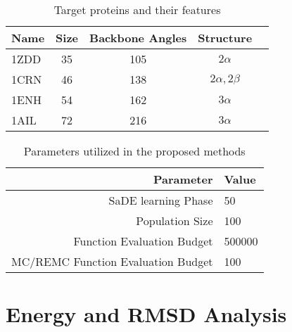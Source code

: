 \begin{table}[bh]
  \centering
  \begin{tabular}{ l | c | c | c | c }
    \hline \hline
    Name & Size & Backbone Angles & Structure         \\ \hline \hline
    1ZDD & 35   & 105             & $2\alpha$         \\ \hline
    1CRN & 46   & 138             & $2\alpha, 2\beta$ \\ \hline
    1ENH & 54   & 162             & $3\alpha$         \\ \hline
    1AIL & 72   & 216             & $3\alpha$         \\ \hline
    \hline
  \end{tabular}
  \caption{Target proteins and their features}
  \label{tab:protein-targets}
\end{table}




\begin{table}[ht]
    \centering
    \begin{tabular}{r|l} \hline \hline
        Parameter & Value \\ \hline \hline
        SaDE learning Phase & 50 \\ \hline
        Population Size & 100 \\ \hline
        Function Evaluation Budget & 500000 \\ \hline
        MC/REMC Function Evaluation Budget & 100 \\ \hline \hline
    \end{tabular}
    \caption{Parameters utilized in the proposed methods}
    \label{tab:parameters}
\end{table}

\section{Energy and \ac{RMSD} Analysis}\label{sec:methods-analysis}







